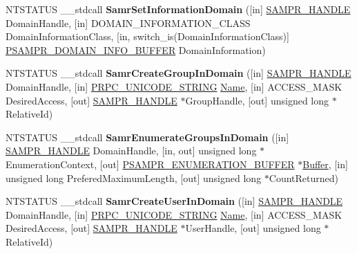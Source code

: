 \begin{DoxyCompactItemize}
\item 
\mbox{\label{interfacesamr_a14f816ae2f7594897bc6fe4d6672a72c}} 
N\+T\+S\+T\+A\+T\+US \+\_\+\+\_\+stdcall {\bfseries Samr\+Set\+Information\+Domain} (\mbox{[}in\mbox{]} \hyperlink{interfacevoid}{S\+A\+M\+P\+R\+\_\+\+H\+A\+N\+D\+LE} Domain\+Handle, \mbox{[}in\mbox{]} D\+O\+M\+A\+I\+N\+\_\+\+I\+N\+F\+O\+R\+M\+A\+T\+I\+O\+N\+\_\+\+C\+L\+A\+SS Domain\+Information\+Class, \mbox{[}in, switch\+\_\+is(Domain\+Information\+Class)\mbox{]} \hyperlink{union___s_a_m_p_r___d_o_m_a_i_n___i_n_f_o___b_u_f_f_e_r}{P\+S\+A\+M\+P\+R\+\_\+\+D\+O\+M\+A\+I\+N\+\_\+\+I\+N\+F\+O\+\_\+\+B\+U\+F\+F\+ER} Domain\+Information)
\item 
\mbox{\label{interfacesamr_aa91452a6c9774db889908182bd875c93}} 
N\+T\+S\+T\+A\+T\+US \+\_\+\+\_\+stdcall {\bfseries Samr\+Create\+Group\+In\+Domain} (\mbox{[}in\mbox{]} \hyperlink{interfacevoid}{S\+A\+M\+P\+R\+\_\+\+H\+A\+N\+D\+LE} Domain\+Handle, \mbox{[}in\mbox{]} \hyperlink{struct___r_p_c___u_n_i_c_o_d_e___s_t_r_i_n_g}{P\+R\+P\+C\+\_\+\+U\+N\+I\+C\+O\+D\+E\+\_\+\+S\+T\+R\+I\+NG} \hyperlink{struct_name_rec__}{Name}, \mbox{[}in\mbox{]} A\+C\+C\+E\+S\+S\+\_\+\+M\+A\+SK Desired\+Access, \mbox{[}out\mbox{]} \hyperlink{interfacevoid}{S\+A\+M\+P\+R\+\_\+\+H\+A\+N\+D\+LE} $\ast$Group\+Handle, \mbox{[}out\mbox{]} unsigned long $\ast$Relative\+Id)
\item 
\mbox{\label{interfacesamr_ac453b0be0a2ad6ba60ed7406e45d10ea}} 
N\+T\+S\+T\+A\+T\+US \+\_\+\+\_\+stdcall {\bfseries Samr\+Enumerate\+Groups\+In\+Domain} (\mbox{[}in\mbox{]} \hyperlink{interfacevoid}{S\+A\+M\+P\+R\+\_\+\+H\+A\+N\+D\+LE} Domain\+Handle, \mbox{[}in, out\mbox{]} unsigned long $\ast$Enumeration\+Context, \mbox{[}out\mbox{]} \hyperlink{struct___s_a_m_p_r___e_n_u_m_e_r_a_t_i_o_n___b_u_f_f_e_r}{P\+S\+A\+M\+P\+R\+\_\+\+E\+N\+U\+M\+E\+R\+A\+T\+I\+O\+N\+\_\+\+B\+U\+F\+F\+ER} $\ast$\hyperlink{class_buffer}{Buffer}, \mbox{[}in\mbox{]} unsigned long Prefered\+Maximum\+Length, \mbox{[}out\mbox{]} unsigned long $\ast$Count\+Returned)
\item 
\mbox{\label{interfacesamr_a62fca447f24839e48af665df480bceae}} 
N\+T\+S\+T\+A\+T\+US \+\_\+\+\_\+stdcall {\bfseries Samr\+Create\+User\+In\+Domain} (\mbox{[}in\mbox{]} \hyperlink{interfacevoid}{S\+A\+M\+P\+R\+\_\+\+H\+A\+N\+D\+LE} Domain\+Handle, \mbox{[}in\mbox{]} \hyperlink{struct___r_p_c___u_n_i_c_o_d_e___s_t_r_i_n_g}{P\+R\+P\+C\+\_\+\+U\+N\+I\+C\+O\+D\+E\+\_\+\+S\+T\+R\+I\+NG} \hyperlink{struct_name_rec__}{Name}, \mbox{[}in\mbox{]} A\+C\+C\+E\+S\+S\+\_\+\+M\+A\+SK Desired\+Access, \mbox{[}out\mbox{]} \hyperlink{interfacevoid}{S\+A\+M\+P\+R\+\_\+\+H\+A\+N\+D\+LE} $\ast$User\+Handle, \mbox{[}out\mbox{]} unsigned long $\ast$Relative\+Id)

\end{DoxyCompactItemize}
